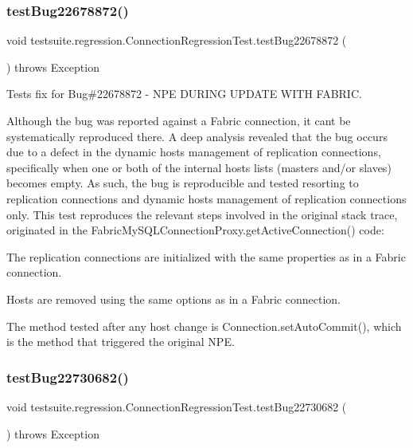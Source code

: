 \subsubsection{\texorpdfstring{test\+Bug22678872()}{testBug22678872()}}
{\footnotesize\ttfamily void testsuite.\+regression.\+Connection\+Regression\+Test.\+test\+Bug22678872 (\begin{DoxyParamCaption}{ }\end{DoxyParamCaption}) throws Exception}

Tests fix for Bug\#22678872 -\/ N\+PE D\+U\+R\+I\+NG U\+P\+D\+A\+TE W\+I\+TH F\+A\+B\+R\+IC.

Although the bug was reported against a Fabric connection, it can\textquotesingle{}t be systematically reproduced there. A deep analysis revealed that the bug occurs due to a defect in the dynamic hosts management of replication connections, specifically when one or both of the internal hosts lists (masters and/or slaves) becomes empty. As such, the bug is reproducible and tested resorting to replication connections and dynamic hosts management of replication connections only. This test reproduces the relevant steps involved in the original stack trace, originated in the Fabric\+My\+S\+Q\+L\+Connection\+Proxy.\+get\+Active\+Connection() code\+:
\begin{DoxyItemize}
\item The replication connections are initialized with the same properties as in a Fabric connection.
\item Hosts are removed using the same options as in a Fabric connection.
\item The method tested after any host change is Connection.\+set\+Auto\+Commit(), which is the method that triggered the original N\+PE. 
\end{DoxyItemize}\mbox{\label{classtestsuite_1_1regression_1_1_connection_regression_test_a415dfcfbf9a9c7542bc8defe119ee97c}} 
\subsubsection{\texorpdfstring{test\+Bug22730682()}{testBug22730682()}}
{\footnotesize\ttfamily void testsuite.\+regression.\+Connection\+Regression\+Test.\+test\+Bug22730682 (\begin{DoxyParamCaption}{ }\end{DoxyParamCaption}) throws Exception}


